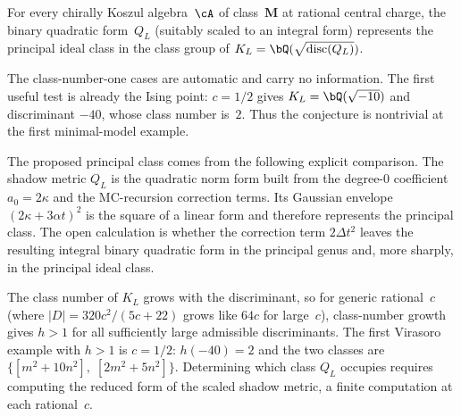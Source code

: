 \begin{conjecture}
\ClaimStatusConjectured
\label{conj:shadow-principal-class}
For every chirally Koszul algebra~$\cA$ of class~$\mathbf{M}$
at rational central charge, the binary quadratic form~$Q_L$
\textup{(}suitably scaled to an integral form\textup{)}
represents the principal ideal class in the class group
of $K_L = \bQ(\sqrt{\operatorname{disc}(Q_L)})$.
\end{conjecture}

\begin{remark}
\label{rem:shadow-principal-criterion}
The class-number-one cases are automatic and carry no information.
The first useful test is already the Ising point:
$c=1/2$ gives $K_L=\bQ(\sqrt{-10})$ and discriminant
$-40$, whose class number is~$2$. Thus the conjecture is
nontrivial at the first minimal-model example.

The proposed principal class comes from the following explicit
comparison. The shadow metric $Q_L$ is the quadratic norm form built
from the degree-$0$ coefficient $a_0=2\kappa$ and the MC-recursion
correction terms. Its Gaussian envelope
$(2\kappa+3\alpha t)^2$ is the square of a linear form and therefore
represents the principal class. The open calculation is whether the
correction term $2\Delta t^2$ leaves the resulting integral binary
quadratic form in the principal genus and, more sharply, in the
principal ideal class.

The class number of $K_L$ grows with the discriminant,
so for generic rational~$c$ (where
$|D| = 320c^2/(5c{+}22)$ grows like $64c$ for large~$c$),
class-number growth gives $h > 1$ for all sufficiently large
admissible discriminants.
The first Virasoro example with $h > 1$ is $c = 1/2$:
$h(-40) = 2$ and the two classes are
$\{[m^2 + 10n^2],\; [2m^2 + 5n^2]\}$.
Determining which class $Q_L$ occupies
requires computing the reduced form of the scaled
shadow metric, a finite computation at each
rational~$c$.
\end{remark}

